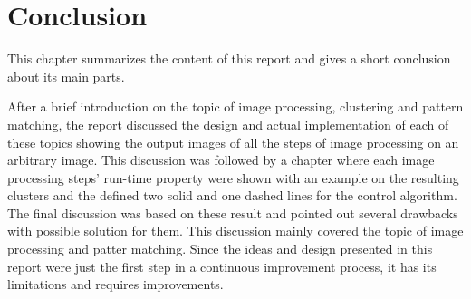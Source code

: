\documentclass[Report.tex]{subfiles}
\begin{document}
\chapter{Conclusion}
\label{chapter:Conclusion}
This chapter summarizes the content of this report and gives a short conclusion about its main parts.

After a brief introduction on the topic of image processing, clustering and
pattern matching, the report discussed the design and actual implementation of
each of these topics showing the output images of all the steps of image
processing on an arbitrary image. This discussion was followed by a chapter
where each image processing steps' run-time property were shown with an example
on the resulting clusters and the defined two solid and one dashed lines
for the control algorithm. The final discussion was based on these result and
pointed out several drawbacks with possible solution for them. This discussion
mainly covered the topic of image processing and patter matching. Since the
ideas and design presented in this report were just the first step in a
continuous improvement process, it has its limitations and requires
improvements.
\end{document}
